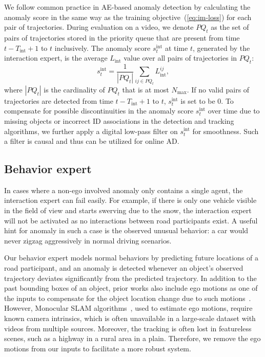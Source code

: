 We follow common practice in AE-based anomaly detection by calculating the anomaly score in the same way as the training objective~(\ref{eq:im-loss}) for each pair of trajectories. During evaluation on a video, we denote $PQ_t$ as the set of pairs of trajectories stored in the priority queue that are present from time $t - T_\text{int} + 1$ to $t$ inclusively. The anomaly score $s_t^\text{int}$ at time $t$, generated by the interaction expert, is the average $L_\text{int}$ value over all pairs of trajectories in $PQ_t$:
\begin{equation}
s_t^\text{int} = \frac{1}{|PQ_t|} \sum_{ij \in PQ_t} L_\text{int}^{ij},
\end{equation}
where $|PQ_t|$ is the cardinality of $PQ_t$ that is at most $N_\text{max}$. If no valid pairs of trajectories are detected from time $t - T_\text{int} + 1$ to $t$, $s_t^\text{int}$ is set to be $0$. To compensate for possible discontinuities in the anomaly score $s_t^\text{int}$ over time due to missing objects or incorrect ID associations in the detection and tracking algorithms, we further apply a digital low-pass filter on $s_t^\text{int}$ for smoothness. Such a filter is causal and thus can be utilized for online AD.

\subsection{Behavior expert}
\label{subsec:bm}
In cases where a non-ego involved anomaly only contains a single agent, the interaction expert can fail easily. For example, if there is only one vehicle visible in the field of view and starts swerving due to the snow, the interaction expert will not be activated as no interactions between road participants exist. A useful hint for anomaly in such a case is the observed unusual behavior: a car would never zigzag aggressively in normal driving scenarios.

Our behavior expert models normal behaviors by predicting future locations of a road participant, and an anomaly is detected whenever an object's observed trajectory deviates significantly from the predicted trajectory. In addition to the past bounding boxes of an object, prior works also include ego motions as one of the inputs to compensate for the object location change due to such motions~\citep{yao2019unsupervised,yao2022dota}. However, Monocular SLAM algorithms~\citep{mur2015orb,mur2017orb,campos2021orb}, used to estimate ego motions, require known camera intrinsics, which is often unavailable in a large-scale dataset with videos from multiple sources. Moreover, the tracking is often lost in featureless scenes, such as a highway in a rural area in a plain. Therefore, we remove the ego motions from our inputs to facilitate a more robust system.

